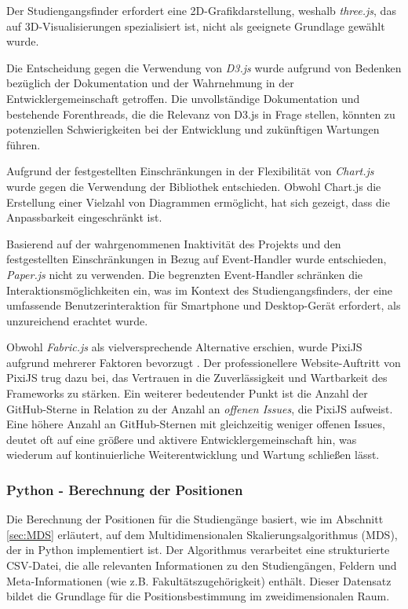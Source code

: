 Der Studiengangsfinder erfordert eine 2D-Grafikdarstellung, weshalb
\textit{three.js}, das auf 3D-Visualisierungen spezialisiert ist, nicht als
geeignete Grundlage gewählt wurde. \parencite{threejs_threejs_2023}

Die Entscheidung gegen die Verwendung von \textit{D3.js} wurde aufgrund
von Bedenken bezüglich der Dokumentation und der Wahrnehmung in der 
Entwicklergemeinschaft getroffen. Die unvollständige Dokumentation und
bestehende Forenthreads, die die Relevanz von D3.js in Frage stellen, könnten zu
potenziellen Schwierigkeiten bei der Entwicklung und zukünftigen Wartungen
führen. \parencite{bostock_d3js_2023}


Aufgrund der festgestellten Einschränkungen in der Flexibilität von
\textit{Chart.js} wurde gegen die Verwendung der Bibliothek entschieden. Obwohl
Chart.js die Erstellung einer Vielzahl von Diagrammen ermöglicht, hat sich
gezeigt, dass die Anpassbarkeit eingeschränkt ist. \parencite{etimberg_chartjs_2023}

Basierend auf der wahrgenommenen Inaktivität des Projekts und den festgestellten 
Einschränkungen in Bezug auf Event-Handler wurde entschieden, \textit{Paper.js}
nicht zu verwenden. \parencite{lehni_paperjs_2023} Die begrenzten Event-Handler schränken
die Interaktionsmöglichkeiten ein, was im Kontext des Studiengangsfinders, der
eine umfassende Benutzerinteraktion für Smartphone und Desktop-Gerät erfordert,
als unzureichend erachtet wurde. \parencite{etimberg_paperjs_2023}

Obwohl \textit{Fabric.js} als vielversprechende Alternative erschien, wurde
PixiJS aufgrund mehrerer Faktoren bevorzugt \parencite{zaytsev_fabricjs_2023}. Der
professionellere Website-Auftritt von PixiJS trug dazu bei, das Vertrauen in
die Zuverlässigkeit und Wartbarkeit des Frameworks zu stärken. Ein weiterer
bedeutender Punkt ist die Anzahl der GitHub-Sterne in Relation zu der Anzahl an
\textit{offenen Issues}, die PixiJS aufweist. Eine höhere Anzahl an
GitHub-Sternen mit gleichzeitig weniger offenen Issues, deutet oft auf eine
größere und aktivere Entwicklergemeinschaft hin, was wiederum auf
kontinuierliche Weiterentwicklung und Wartung schließen lässt.
\parencite{batista_github_2023}

\subsubsection{Python - Berechnung der Positionen}
Die Berechnung der Positionen für die Studiengänge basiert, wie im Abschnitt
\ref{sec:MDS} erläutert, auf dem Multidimensionalen Skalierungsalgorithmus
(MDS), der in Python implementiert ist. Der Algorithmus verarbeitet eine
strukturierte CSV-Datei, die alle relevanten Informationen zu den Studiengängen,
Feldern und Meta-Informationen (wie z.B. Fakultätszugehörigkeit) enthält. Dieser
Datensatz bildet die Grundlage für die Positionsbestimmung im zweidimensionalen
Raum.

